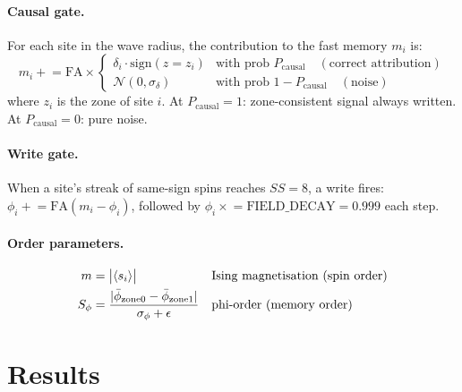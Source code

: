 \documentclass[11pt,a4paper]{article}
\begin{document}
\paragraph{Causal gate.}
For each site in the wave radius, the contribution to the fast memory
$m_i$ is:
\begin{equation}
  m_i \mathrel{+}=
  \mathrm{FA} \times \begin{cases}
    \delta_i \cdot \mathrm{sign}(z = z_i) & \text{with prob } P_\mathrm{causal}
    \quad (\text{correct attribution}) \\
    \mathcal{N}(0,\sigma_\delta) & \text{with prob } 1-P_\mathrm{causal}
    \quad (\text{noise})
  \end{cases}
\end{equation}
where $z_i$ is the zone of site $i$.
At $P_\mathrm{causal}=1$: zone-consistent signal always written.
At $P_\mathrm{causal}=0$: pure noise.

\paragraph{Write gate.}
When a site's streak of same-sign spins reaches $SS=8$, a write fires:
$\phi_i \mathrel{+}= \mathrm{FA}(m_i - \phi_i)$,
followed by $\phi_i \mathrel{\times}= \text{FIELD\_DECAY}=0.999$ each step.

\paragraph{Order parameters.}
\begin{align}
  m &= \bigl|\langle s_i \rangle\bigr|
  && \text{Ising magnetisation (spin order)} \\
  S_\phi &= \frac{|\bar\phi_{\rm zone0} - \bar\phi_{\rm zone1}|}{\sigma_\phi + \epsilon}
  && \text{phi-order (memory order)}
\end{align}

\section{Results}
\end{document}
